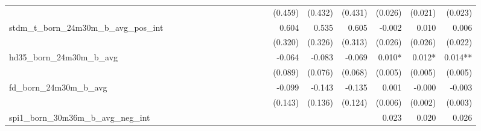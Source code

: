 \begin{tabular}{lrrrrrrrrrrrrrrrrrr}
                                            &              &              &              &              &              &              &              &              &               &              &              &               &      (0.459) &      (0.432) &       (0.431) &      (0.026) &      (0.021) &       (0.023) \\ 
stdm\_t\_born\_24m30m\_b\_avg\_pos\_int     &              &              &              &              &              &              &              &              &               &              &              &               &        0.604 &        0.535 &         0.605 &       -0.002 &        0.010 &         0.006 \\ 
                                            &              &              &              &              &              &              &              &              &               &              &              &               &      (0.320) &      (0.326) &       (0.313) &      (0.026) &      (0.026) &       (0.022) \\ 
hd35\_born\_24m30m\_b\_avg                  &              &              &              &              &              &              &              &              &               &              &              &               &       -0.064 &       -0.083 &        -0.069 &       0.010* &       0.012* &       0.014** \\ 
                                            &              &              &              &              &              &              &              &              &               &              &              &               &      (0.089) &      (0.076) &       (0.068) &      (0.005) &      (0.005) &       (0.005) \\ 
fd\_born\_24m30m\_b\_avg                    &              &              &              &              &              &              &              &              &               &              &              &               &       -0.099 &       -0.143 &        -0.135 &        0.001 &       -0.000 &        -0.003 \\ 
                                            &              &              &              &              &              &              &              &              &               &              &              &               &      (0.143) &      (0.136) &       (0.124) &      (0.006) &      (0.002) &       (0.003) \\ 
spi1\_born\_30m36m\_b\_avg\_neg\_int        &              &              &              &              &              &              &              &              &               &              &              &               &              &              &               &        0.023 &        0.020 &         0.026 \\ 

\end{tabular}
